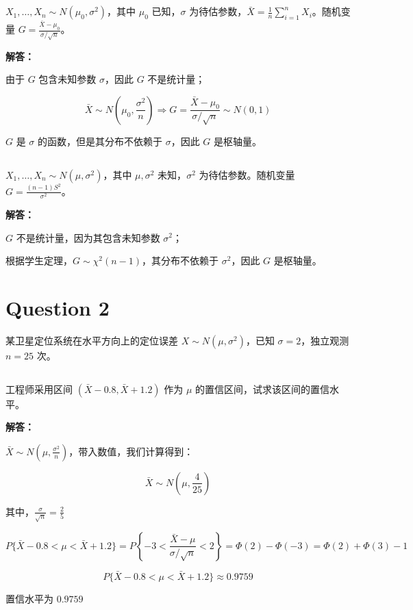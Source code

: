 \documentclass[12pt,a4paper]{article}
\begin{document}
\subsection{}

$X_1,\ldots,X_n \sim N(\mu_0,\sigma^2)$，其中 $\mu_0$ 已知，$\sigma$ 为待估参数，$\bar{X} = \frac{1}{n}\sum_{i=1}^{n}X_i$。随机变量 $G = \frac{\bar{X}-\mu_0}{\sigma/\sqrt{n}}$。

\begin{answerbox}
\textbf{解答：}

由于 $G$ 包含未知参数 $\sigma$，因此 $G$ 不是统计量；

$$
\bar{X} \sim N(\mu_0, \frac{\sigma^2}{n}) \Rightarrow G = \frac{\bar{X}-\mu_0}{\sigma/\sqrt{n}} \sim N(0,1)
$$

$G$ 是 $\sigma$ 的函数，但是其分布不依赖于 $\sigma$，因此 $G$ 是枢轴量。

\end{answerbox}

\subsection{}

$X_1,\ldots,X_n \sim N(\mu,\sigma^2)$，其中 $\mu,\sigma^2$ 未知，$\sigma^2$ 为待估参数。随机变量 $G = \frac{(n-1)S^2}{\sigma^2}$。

\begin{answerbox}
\textbf{解答：}

$G$ 不是统计量，因为其包含未知参数 $\sigma^2$；

根据学生定理，$G \sim \chi^2(n-1)$，其分布不依赖于 $\sigma^2$，因此 $G$ 是枢轴量。

\end{answerbox}

\section{Question 2}

某卫星定位系统在水平方向上的定位误差 $X \sim N(\mu,\sigma^2)$，已知 $\sigma=2$，独立观测 $n=25$ 次。

\subsection{}

工程师采用区间 $(\bar{X} - 0.8, \bar{X} + 1.2)$ 作为 $\mu$ 的置信区间，试求该区间的置信水平。

\begin{answerbox}
\textbf{解答：}

$\bar{X} \sim N(\mu, \frac{\sigma^2}{n})$，带入数值，我们计算得到：

$$
\bar{X} \sim N\left(\mu, \frac{4}{25}\right)
$$

其中，$\frac{\sigma}{\sqrt{n}} = \frac{2}{5}$

$$
P\{\bar{X}-0.8 < \mu < \bar{X}+1.2\} = P\left\{-3 < \frac{\bar{X}-\mu}{\sigma/\sqrt{n}} < 2 \right\} = \Phi(2) - \Phi(-3) = \Phi(2) + \Phi(3) - 1 
$$

$$
P\{\bar{X}-0.8 < \mu < \bar{X}+1.2\} \approx 0.9759
$$

置信水平为 $0.9759$

\end{answerbox}
\end{document}
